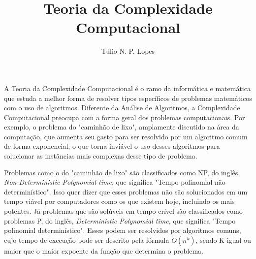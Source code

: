 \documentclass[12pt]{article}
\title{Teoria da Complexidade Computacional}
\author{Túlio N. P. Lopes\inst{1}}
\begin{document}
 
	
	\maketitle
	
	
	
	
	A Teoria da Complexidade Computacional é o ramo da informática e matemática que estuda 
	a melhor forma de resolver tipos específicos de problemas matemáticos com o uso de algoritmos.
	Diferente da Análise de Algoritmos, a Complexidade Computacional preocupa com a forma geral dos problemas computacionais. Por exemplo, o problema do "caminhão de lixo", amplamente discutido na área da computação, que aumenta seu gasto para ser resolvido por um algoritmo comum de forma exponencial, o que torna inviável o uso desses algoritmos para solucionar as instâncias mais complexas desse tipo de problema.
	
	Problemas como o do "caminhão de lixo" são classificados como NP, do inglês, {\it Non-Deterministic Polynomial time}, que significa "Tempo polinomial não determinístico". Isso quer dizer que esses problemas não são solucionados em um tempo viável por computadores como os que existem hoje, incluindo os mais potentes. Já problemas que são solúveis em tempo crível são classificados como problemas P, do inglês, {\it Deterministic Polynomial time}, que significa "Tempo polinomial determinístico". Esses podem ser resolvidos por algoritmos comuns, cujo tempo de execução pode ser descrito pela fórmula $O(n^{k})$, sendo K igual ou maior que o maior expoente da função que determina o problema.
	
\end{document}
